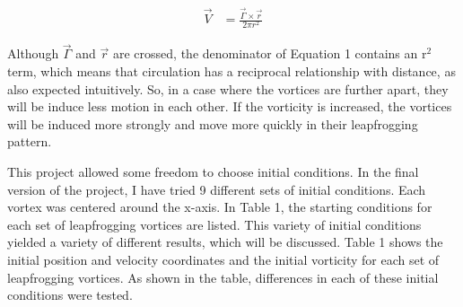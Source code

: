 \documentclass{article}
\begin{document}
\begin{equation} \label{eq:1}
    \begin{aligned}
        \vec{V} &= \frac{\vec{\Gamma} \times \vec{r}}{2 \pi r^2}
    \end{aligned}
\end{equation}

Although $\vec{\Gamma}$ and $\vec{r}$ are crossed, the denominator of Equation 1 contains an r$^2$ term, which means that circulation has a reciprocal relationship with distance, as also expected intuitively. So, in a case where the vortices are further apart, they will be induce less motion in each other. If the vorticity is increased, the vortices will be induced more strongly and move more quickly in their leapfrogging pattern. \newline

This project allowed some freedom to choose initial conditions. In the final version of the project, I have tried 9 different sets of initial conditions. Each vortex was centered around the x-axis. In Table 1, the starting conditions for each set of leapfrogging vortices are listed. This variety of initial conditions yielded a variety of different results, which will be discussed. Table 1 shows the initial position and velocity coordinates and the initial vorticity for each set of leapfrogging vortices. As shown in the table, differences in each of these initial conditions were tested. \newline
\end{document}
